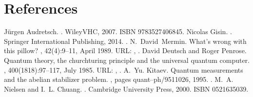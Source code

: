 \documentclass[letterpaper,10pt,english]{jupyterBook}
\begin{document}
\chapter{References}
\label{\detokenize{references:references}}\label{\detokenize{references::doc}}
\begin{sphinxthebibliography}{1}
\sphinxAtStartPar
Jürgen Audretsch. . Wiley\sphinxhyphen{}VHC, 2007. ISBN 978\sphinxhyphen{}3\sphinxhyphen{}527\sphinxhyphen{}40684\sphinxhyphen{}5.
\sphinxAtStartPar
Nicolas Gisin. . Springer International Publishing, 2014. .
\sphinxAtStartPar
N. David Mermin. What's wrong with this pillow? , 42(4):9–11, April 1989. URL: , .
\sphinxAtStartPar
David Deutsch and Roger Penrose. Quantum theory, the church\sphinxhyphen{}turing principle and the universal quantum computer. , 400(1818):97–117, July 1985. URL: , .
\sphinxAtStartPar
A. Yu. Kitaev. Quantum measurements and the abelian stabilizer problem. , pages quant–ph/9511026, 1995. .
\sphinxAtStartPar
M. A. Nielsen and I. L. Chuang. . Cambridge University Press, 2000. ISBN 0\sphinxhyphen{}521\sphinxhyphen{}63503\sphinxhyphen{}9.
\end{sphinxthebibliography}







\renewcommand{\indexname}{Index}
\printindex
\end{document}
